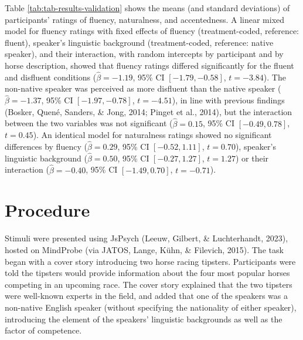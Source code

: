 \documentclass[
  man,floatsintext]{apa7}
\begin{document}
Table \ref{tab:tab-results-validation} shows the means (and standard deviations) of participants' ratings of fluency, naturalness, and accentedness. A linear mixed model for fluency ratings with fixed effects of fluency (treatment-coded, reference: fluent), speaker's linguistic background (treatment-coded, reference: native speaker), and their interaction, with random intercepts by participant and by horse description, showed that fluency ratings differed significantly for the fluent and disfluent conditions (\(\hat{\beta} = -1.19\), 95\% CI \([-1.79, -0.58]\), \(t = -3.84\)). The non-native speaker was perceived as more disfluent than the native speaker (\(\hat{\beta} = -1.37\), 95\% CI \([-1.97, -0.78]\), \(t = -4.51\)), in line with previous findings (Bosker, Quené, Sanders, \& Jong, 2014; Pinget et al., 2014), but the interaction between the two variables was not significant (\(\hat{\beta} = 0.15\), 95\% CI \([-0.49, 0.78]\), \(t = 0.45\)). An identical model for naturalness ratings showed no significant differences by fluency (\(\hat{\beta} = 0.29\), 95\% CI \([-0.52, 1.11]\), \(t = 0.70\)), speaker's linguistic background (\(\hat{\beta} = 0.50\), 95\% CI \([-0.27, 1.27]\), \(t = 1.27\)) or their interaction (\(\hat{\beta} = -0.40\), 95\% CI \([-1.49, 0.70]\), \(t = -0.71\)).

\hypertarget{procedure}{%
\section{Procedure}\label{procedure}}

Stimuli were presented using JsPsych (Leeuw, Gilbert, \& Luchterhandt, 2023), hosted on MindProbe (via JATOS, Lange, Kühn, \& Filevich, 2015). The task began with a cover story introducing two horse racing tipsters. Participants were told the tipsters would provide information about the four most popular horses competing in an upcoming race. The cover story explained that the two tipsters were well-known experts in the field, and added that one of the speakers was a non-native English speaker (without specifying the nationality of either speaker), introducing the element of the speakers' linguistic backgrounds as well as the factor of competence.
\end{document}
